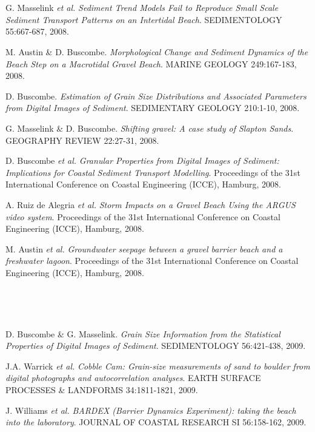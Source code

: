 \documentclass{article} %
\def\sf{\sffamily}
\def\sl{\slshape}
\newlength\sidebarwidth
\newcommand{\subtopic}[3][]
	 {\begin{minipage}{\textwidth}
	 \vspace*{.4\baselineskip}
         \nopagebreak\hspace{0in}%
         \nopagebreak\begin{minipage}[t]{\sidebarwidth - .2cm}
         \raggedleft {\sf\fontseries{sbc}\selectfont #2}
         {\\[-0.2\baselineskip] \textcolor{gray}{\footnotesize #1}}
	 \end{minipage}%
	 \hfill
	 \begin{minipage}[t]{\linewidth - \sidebarwidth}
	 #3%
	 \end{minipage}%
	 \vspace*{.2\baselineskip plus 1\baselineskip minus
	 .2\baselineskip}%
	 \end{minipage}}
\begin{document}
\subtopic{\hspace*{-3ex} 2008}{~
  \begin{itemize}[leftmargin=0ex, itemsep=0ex, parsep=.5ex, labelindent=-4ex]

    \publication
      G. Masselink {\sl et al.}
      {\sl Sediment Trend Models Fail to Reproduce Small Scale Sediment Transport Patterns on an Intertidal Beach}.
      SEDIMENTOLOGY 55:667-687, 2008.

    \publication
      M. Austin \& D. Buscombe.
      {\sl Morphological Change and Sediment Dynamics of the Beach Step on a Macrotidal Gravel Beach}.
      MARINE GEOLOGY 249:167-183, 2008.

    \publication
      D. Buscombe.
      {\sl Estimation of Grain Size Distributions and Associated Parameters from Digital Images of Sediment}.
      SEDIMENTARY GEOLOGY 210:1-10, 2008.

    \publication
      G. Masselink \& D. Buscombe.
      {\sl Shifting gravel: A case study of Slapton Sands}.
      GEOGRAPHY REVIEW 22:27-31, 2008.

    \publication
      D. Buscombe {\sl et al.}
      {\sl Granular Properties from Digital Images of Sediment: Implications for Coastal Sediment Transport Modelling}.
      Proceedings of the 31st International Conference on Coastal Engineering (ICCE), Hamburg, 2008.

    \publication
      A. Ruiz de Alegria {\it et al.}
      {\it Storm Impacts on a Gravel Beach Using the ARGUS video system}.
      Proceedings of the 31st International Conference on Coastal Engineering (ICCE), Hamburg, 2008.

    \publication
      M. Austin {\sl et al.}
      {\it Groundwater seepage between a gravel barrier beach and a freshwater lagoon}.
      Proceedings of the 31st International Conference on Coastal Engineering (ICCE), Hamburg, 2008.

    \end{itemize}
}

\subtopic{\hspace*{-3ex} 2009}{~
  \begin{itemize}[leftmargin=0ex, itemsep=0ex, parsep=.5ex, labelindent=-4ex]

    \publication
      D. Buscombe \& G. Masselink.
      {\sl Grain Size Information from the Statistical Properties of Digital Images of Sediment}.
      SEDIMENTOLOGY 56:421-438, 2009.

    \publication
      J.A. Warrick {\sl et al.}
      {\sl Cobble Cam: Grain-size measurements of sand to boulder from digital photographs and autocorrelation analyses}.
      EARTH SURFACE PROCESSES \& LANDFORMS 34:1811-1821, 2009.

    \publication
      J. Williams {\sl et al.}
      {\sl BARDEX (Barrier Dynamics Experiment): taking the beach into the laboratory}.
      JOURNAL OF COASTAL RESEARCH SI 56:158-162, 2009.

    \end{itemize}
}
\end{document}
